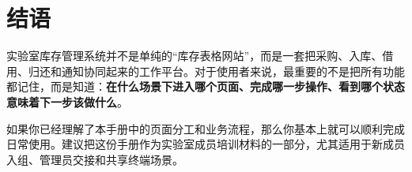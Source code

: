 \documentclass[12pt,a4paper]{ctexart}
\begin{document}
\section{结语}

实验室库存管理系统并不是单纯的“库存表格网站”，而是一套把采购、入库、借用、归还和通知协同起来的工作平台。对于使用者来说，最重要的不是把所有功能都记住，而是知道：\textbf{在什么场景下进入哪个页面、完成哪一步操作、看到哪个状态意味着下一步该做什么}。

如果你已经理解了本手册中的页面分工和业务流程，那么你基本上就可以顺利完成日常使用。建议把这份手册作为实验室成员培训材料的一部分，尤其适用于新成员入组、管理员交接和共享终端场景。
\end{document}
